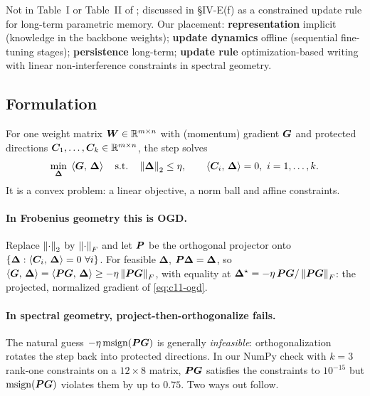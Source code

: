 \begin{taxonomy}
Not in Table~I or Table~II of \citet{zhoubian2026memory}; discussed in \S IV-E(f) as a constrained
update rule for long-term parametric memory. Our placement: \textbf{representation} implicit
(knowledge in the backbone weights); \textbf{update dynamics} offline (sequential fine-tuning
stages); \textbf{persistence} long-term; \textbf{update rule} optimization-based writing with
linear non-interference constraints in spectral geometry.
\end{taxonomy}

\subsection{Formulation}\label{sec:c11-mo-formulation}

For one weight matrix $\bm{W} \in \mathbb{R}^{m\times n}$ with (momentum) gradient $\bm{G}$ and protected
directions $\bm{C}_1,\dots,\bm{C}_k \in \mathbb{R}^{m\times n}$, the step solves
\begin{equation}
  \min_{\bm{\Delta}}\; \left\langle \bm{G},\, \bm{\Delta}\right\rangle
  \quad\text{s.t.}\quad \left\lVert \bm{\Delta}\right\rVert_2 \le \eta, \qquad \left\langle \bm{C}_i,\, \bm{\Delta}\right\rangle = 0,\ i = 1,\dots,k .
  \label{eq:c11-mo-primal}
\end{equation}
It is a convex problem: a linear objective, a norm ball and affine constraints.

\paragraph{In Frobenius geometry this is OGD.} Replace $\left\lVert \cdot\right\rVert_2$ by $\left\lVert \cdot\right\rVert_F$ and let
$\bm{P}$ be the orthogonal projector onto $\{\bm{\Delta} : \inner{\mC_i}{\bm{\Delta}} = 0\ \forall i\}$. For
feasible $\bm{\Delta}$, $\bm{P}\bm{\Delta} = \bm{\Delta}$, so $\left\langle \bm{G},\, \bm{\Delta}\right\rangle = \left\langle \bm{P}\bm{G},\, \bm{\Delta}\right\rangle \ge
-\eta\left\lVert \bm{P}\bm{G}\right\rVert_F$, with equality at $\bm{\Delta}^\star = -\eta\,\bm{P}\bm{G}/\left\lVert \bm{P}\bm{G}\right\rVert_F$: the
projected, normalized gradient of \cref{eq:c11-ogd}.

\paragraph{In spectral geometry, project-then-orthogonalize fails.} The natural guess
$-\eta\operatorname{msign}(\bm{P}\bm{G})$ is generally \emph{infeasible}: orthogonalization rotates the
step back into protected directions. In our NumPy check with $k = 3$ rank-one constraints on a
$12\times8$ matrix, $\bm{P}\bm{G}$ satisfies the constraints to $10^{-15}$ but
$\operatorname{msign}(\bm{P}\bm{G})$ violates them by up to $0.75$. Two ways out follow.

